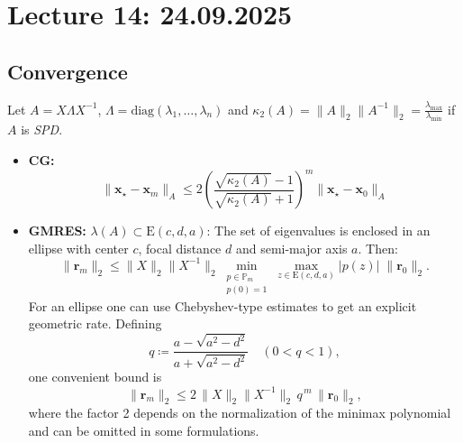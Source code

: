 \section{Lecture 14: 24.09.2025}

\subsection{Convergence}
Let $A = X \Lambda X^{-1}$, $\Lambda = \mathrm{diag}(\lambda_1, \ldots, \lambda_n)$ and $\kappa_2(A) = \|A\|_2 \|A^{-1}\|_2 = \frac{\lambda_{\max}}{\lambda_{\min}}$ if $A$ is \emph{SPD}.

\begin{itemize}
    \item \textbf{CG:}
          \[
              \|\mathbf{x}_\star - \mathbf{x}_m\|_A \leq 2\left(\frac{\sqrt{\kappa_2(A)} - 1}{\sqrt{\kappa_2(A)} + 1}\right)^m \|\mathbf{x}_\star - \mathbf{x}_0\|_A
          \]
    \item \textbf{GMRES:} $\lambda(A) \subset \mathrm{E}(c,d,a)$: The set of eigenvalues is enclosed in an ellipse with center $c$, focal distance $d$ and semi-major axis $a$. Then:
          \[
              \|\mathbf{r}_m\|_2 \le \|X\|_2\|X^{-1}\|_2
              \min_{\substack{p\in\mathbb{P}_m\\p(0)=1}}
              \max_{z\in \mathrm{E}(c,d,a)} |p(z)| \;\|\mathbf{r}_0\|_2.
          \]
          For an ellipse one can use Chebyshev-type estimates to get an explicit geometric rate. Defining
          \[
              q \coloneqq \frac{a-\sqrt{a^2-d^2}}{a+\sqrt{a^2-d^2}}\quad(0<q<1),
          \]
          one convenient bound is
          \[
              \|\mathbf{r}_m\|_2 \le 2\,\|X\|_2\|X^{-1}\|_2\, q^{\,m}\,\|\mathbf{r}_0\|_2,
          \]
          where the factor 2 depends on the normalization of the minimax polynomial and can be omitted in some formulations.

          \begin{center}
          \end{center}
\end{itemize}

